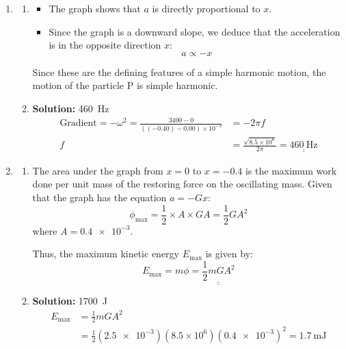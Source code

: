 \documentclass[11pt]{article}
\def\doubleunderline#1{\underline{\underline{#1}}}
\newcommand{\solution}[1]{\textbf{Solution: } #1 \hspace{5mm}}
\begin{document}
\begin{enumerate}[label={[D\arabic*]},itemsep={1em}]
		\item 
			\begin{enumerate}
				\item 
					\begin{enumerate}
						\item 
							\begin{itemize}
								\item The graph shows that $a$ is directly proportional to $x$.
								\item Since the graph is a downward slope, we deduce that the acceleration is in the opposite direction $x$:
									\begin{equation*}
										a \propto -x
									\end{equation*}
							\end{itemize} 
							\vspace{-0.5em}
							Since these are the defining features of a simple harmonic motion, the motion of the particle P is simple harmonic.
						\item \solution{\SI{460}{\hertz}}
							\begin{align*}
								\text{Gradient} = -\omega^2 = \frac{3400 - 0}{\left(\left(-0.40\right)-0.00\right)\times 10^{-3}} &= -2\pi\! f \\
								f &= \frac{\sqrt{8.5\times 10^6}}{2\pi} = \doubleunderline{\SI{460}{\hertz}}
							\end{align*}
					\end{enumerate}
				\item 
					\begin{enumerate}
						\item 
							The area under the graph from $x=0$ to $x=-0.4$ is the maximum work done per unit mass of the restoring force on the oscillating mass. Given that the graph has the equation $a = -Gx$:
							\begin{equation*}
								\phi_\text{max} = \frac{1}{2}\times A \times G\!A = \frac{1}{2}G\!A^2
							\end{equation*}
							where $A = \num{0.4e-3}$.
							
							Thus, the maximum kinetic energy $E_\text{max}$ is given by:
							\begin{equation*}
								E_\text{max} = m\phi = \doubleunderline{\frac{1}{2}mG\!A^2}
							\end{equation*}
						\item \solution{\SI{1700}{\joule}}
							\begin{align*}
								E_\text{max} &= \frac{1}{2}mG\!A^2 \\
								&= \frac{1}{2}\left(\num{2.5e-3}\right)\left(8.5\times 10^6\right)\left(\num{0.4e-3}\right)^2 = \SI{1.7}{\milli\joule}
							\end{align*}
					\end{enumerate}
			\end{enumerate}
		

\end{enumerate}
\end{document}
